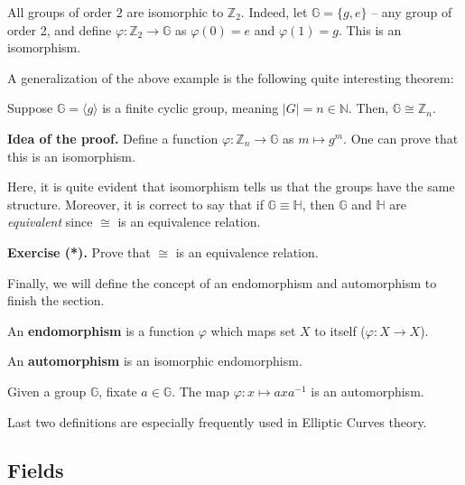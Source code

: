 \documentclass[../lecture-notes-148x210.tex]{subfiles}
\begin{document}
\begin{example}
    All groups of order $2$ are isomorphic to $\mathbb{Z}_2$. Indeed, let $\mathbb{G} = \{g,e\}$ -- any group of order 2, and define $\varphi: \mathbb{Z}_2 \to \mathbb{G}$ as $\varphi(0) = e$ and $\varphi(1) = g$. This is an isomorphism.
\end{example}

A generalization of the above example is the following quite interesting theorem:

\begin{theorem}
    Suppose $\mathbb{G} = \langle g \rangle$ is a finite cyclic group, meaning $|G| = n \in \mathbb{N}$. Then, $\mathbb{G} \cong \mathbb{Z}_n$.
\end{theorem}

\textbf{Idea of the proof.} Define a function $\varphi: \mathbb{Z}_n \to \mathbb{G}$ as $m \mapsto g^m$. One can prove that this is an isomorphism.

Here, it is quite evident that isomorphism tells us that the groups have the same structure. Moreover, it is correct to say that if $\mathbb{G} \equiv \mathbb{H}$, then $\mathbb{G}$ and $\mathbb{H}$ are \textit{equivalent} since $\cong$ is an equivalence relation.

\textbf{Exercise (*).} Prove that $\cong$ is an equivalence relation.

Finally, we will define the concept of an endomorphism and automorphism to finish the section.

\begin{definition}
    An \textbf{endomorphism} is a function $\varphi$ which maps set $X$ to itself ($\varphi: X \to X$).
\end{definition}

\begin{definition}
    An \textbf{automorphism} is an isomorphic endomorphism.
\end{definition}

\begin{example}
    Given a group $\mathbb{G}$, fixate $a \in \mathbb{G}$. The map $\varphi: x \mapsto axa^{-1}$ is an automorphism.
\end{example}

Last two definitions are especially frequently used in Elliptic Curves theory.

\subsection{Fields}
\end{document}
